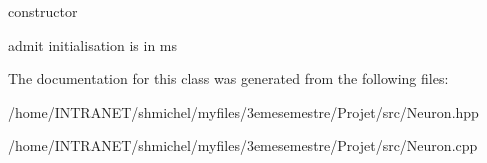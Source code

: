 constructor 

admit initialisation is in ms 

The documentation for this class was generated from the following files\-:\begin{DoxyCompactItemize}
\item 
/home/\-I\-N\-T\-R\-A\-N\-E\-T/shmichel/myfiles/3emesemestre/\-Projet/src/Neuron.\-hpp\item 
/home/\-I\-N\-T\-R\-A\-N\-E\-T/shmichel/myfiles/3emesemestre/\-Projet/src/Neuron.\-cpp\end{DoxyCompactItemize}
